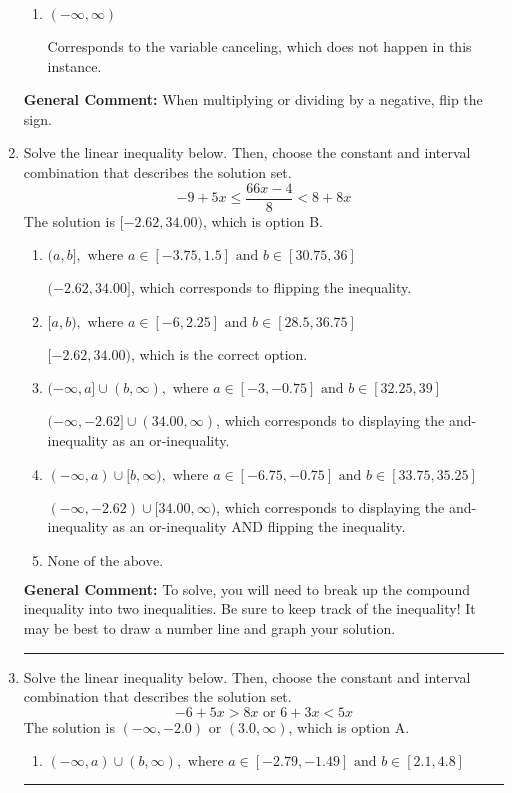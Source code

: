 \documentclass{extbook}[14pt]
\newcommand{\litem}[1]{\item #1

\rule{\textwidth}{0.4pt}}
\begin{document}
\begin{enumerate}
{\begin{enumerate}[label=\Alph*.]
Corresponds to including the endpoints AND negating.
\item \( (-\infty, \infty) \)

Corresponds to the variable canceling, which does not happen in this instance.
\end{enumerate}

\textbf{General Comment:} When multiplying or dividing by a negative, flip the sign.
}
\litem{
Solve the linear inequality below. Then, choose the constant and interval combination that describes the solution set.
\[ -9 + 5 x \leq \frac{66 x - 4}{8} < 8 + 8 x \]The solution is \( [-2.62, 34.00) \), which is option B.\begin{enumerate}[label=\Alph*.]
\item \( (a, b], \text{ where } a \in [-3.75, 1.5] \text{ and } b \in [30.75, 36] \)

$(-2.62, 34.00]$, which corresponds to flipping the inequality.
\item \( [a, b), \text{ where } a \in [-6, 2.25] \text{ and } b \in [28.5, 36.75] \)

$[-2.62, 34.00)$, which is the correct option.
\item \( (-\infty, a] \cup (b, \infty), \text{ where } a \in [-3, -0.75] \text{ and } b \in [32.25, 39] \)

$(-\infty, -2.62] \cup (34.00, \infty)$, which corresponds to displaying the and-inequality as an or-inequality.
\item \( (-\infty, a) \cup [b, \infty), \text{ where } a \in [-6.75, -0.75] \text{ and } b \in [33.75, 35.25] \)

$(-\infty, -2.62) \cup [34.00, \infty)$, which corresponds to displaying the and-inequality as an or-inequality AND flipping the inequality.
\item \( \text{None of the above.} \)


\end{enumerate}

\textbf{General Comment:} To solve, you will need to break up the compound inequality into two inequalities. Be sure to keep track of the inequality! It may be best to draw a number line and graph your solution.
}
\litem{
Solve the linear inequality below. Then, choose the constant and interval combination that describes the solution set.
\[ -6 + 5 x > 8 x \text{ or } 6 + 3 x < 5 x \]The solution is \( (-\infty, -2.0) \text{ or } (3.0, \infty) \), which is option A.\begin{enumerate}[label=\Alph*.]
\item \( (-\infty, a) \cup (b, \infty), \text{ where } a \in [-2.79, -1.49] \text{ and } b \in [2.1, 4.8] \)


\end{enumerate}}
\end{enumerate}
\end{document}
